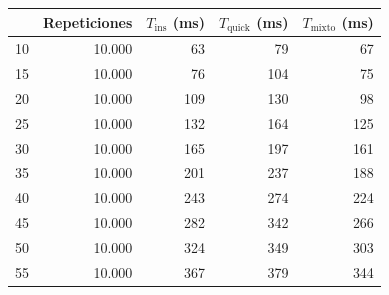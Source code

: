\documentclass[12pt,a4paper]{article}
\begin{document}
\begin{table}[H]
\centering
\renewcommand{\arraystretch}{1.2}
\begin{tabular}{|r|r|r|r|r|}
\hline
\rowcolor{LightSteelBlue2}
\multicolumn{1}{|c|}{n} & \multicolumn{1}{c|}{Repeticiones} & \multicolumn{1}{c|}{$T_\text{ins}$ (ms)} & \multicolumn{1}{c|}{$T_\text{quick}$ (ms)} & \multicolumn{1}{c|}{$T_\text{mixto}$ (ms)} \\ \hline
10                      & 10.000                             & 63                               & 79                                 & 67                                 \\ \hline
15                      & 10.000                             & 76                               & 104                                & 75                                 \\ \hline
20                      & 10.000                             & 109                              & 130                                & 98                                 \\ \hline
25                      & 10.000                             & 132                              & 164                                & 125                                \\ \hline
30                      & 10.000                             & 165                              & 197                                & 161                                \\ \hline
35                      & 10.000                             & 201                              & 237                                & 188                                \\ \hline
40                      & 10.000                             & 243                              & 274                                & 224                                \\ \hline
45                      & 10.000                             & 282                              & 342                                & 266                                \\ \hline
50                      & 10.000                             & 324                              & 349                                & 303                                \\ \hline
55                      & 10.000                             & 367                              & 379                                & 344                                \\ \hline

\end{tabular}
\end{table}
\end{document}
